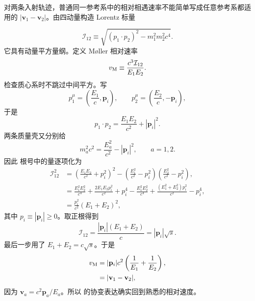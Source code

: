 \begin{derivation}
对两条入射轨迹，普通同一参考系中的相对相遇速率不能简单写成任意参考系都适用的 $|\mathbf v_1-\mathbf v_2|$。由四动量构造 Lorentz 标量

\begin{equation*}
 \mathcal I_{12}
 \equiv\sqrt{(p_1\!\cdot p_2)^2-m_1^2m_2^2c^4}.
 \end{equation*}
它具有动量平方量纲。定义 M\o ller 相对速率
\begin{equation*}
 v_{\rm M}
 \equiv
 \frac{c^3\mathcal I_{12}}{E_1E_2}.
 \end{equation*}
检查质心系时不跳过中间平方。写
\begin{equation*}
 p_1^\mu=\left(\frac{E_1}{c},\mathbf p_i\right),
 \qquad
 p_2^\mu=\left(\frac{E_2}{c},-\mathbf p_i\right),
\end{equation*}
于是
\begin{equation*}
 p_1\!\cdot p_2=\frac{E_1E_2}{c^2}+|\mathbf p_i|^2.
\end{equation*}
两条质量壳又分别给
\begin{equation*}
 m_a^2c^2=\frac{E_a^2}{c^2}-|\mathbf p_i|^2,
 \qquad a=1,2.
\end{equation*}
因此  根号中的量逐项化为
\begin{align*}
 \mathcal I_{12}^2
 &=\left(\frac{E_1E_2}{c^2}+p_i^2\right)^2
 -\left(\frac{E_1^2}{c^2}-p_i^2\right)
  \left(\frac{E_2^2}{c^2}-p_i^2\right),\\
 &=\frac{E_1^2E_2^2}{c^4}
 +\frac{2E_1E_2p_i^2}{c^2}+p_i^4
 -\frac{E_1^2E_2^2}{c^4}
 +\frac{(E_1^2+E_2^2)p_i^2}{c^2}-p_i^4,\\
 &=\frac{p_i^2}{c^2}(E_1+E_2)^2,
\end{align*}
其中 $p_i\equiv|\mathbf p_i|\ge0$。取正根得到
\begin{equation*}
 {
 \mathcal I_{12}
 =\frac{|\mathbf p_i|(E_1+E_2)}{c}
 =|\mathbf p_i|\sqrt s.}
 \end{equation*}
最后一步用了 $E_1+E_2=c\sqrt s$。于是
\begin{align*}
 v_{\rm M}
 &=|\mathbf p_i|c^2
 \left(\frac1{E_1}+\frac1{E_2}\right),\\
 &=|\mathbf v_1-\mathbf v_2|,
\end{align*}
因为 $\mathbf v_a=c^2\mathbf p_a/E_a$。所以  的协变表达确实回到熟悉的相对速度。
\end{derivation}

